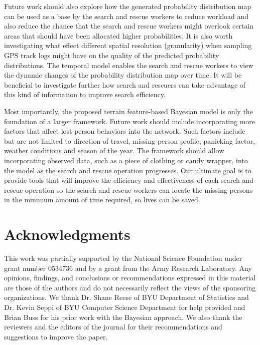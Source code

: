 \documentclass[smallextended,natbib]{svjour3}
\begin{document}
Future work should also explore how the generated probability distribution map can be used as a base by the search and rescue workers to reduce workload and also reduce the chance that the search and rescue workers might overlook certain areas that should have been allocated higher probabilities. It is also worth investigating what effect different spatial resolution (granularity) when sampling GPS track logs might have on the quality of the predicted probability distributions. The temporal model enables the search and rescue workers to view the dynamic changes of the probability distribution map over time. It will be beneficial to investigate further how search and rescuers can take advantage of this kind of information to improve search efficiency.

Most importantly, the proposed terrain feature-based Bayesian model is only the foundation of a larger framework. Future work should include incorporating more factors that affect lost-person behaviors into the network. Such factors include but are not limited to direction of travel, missing person profile, panicking factor, weather conditions and season of the year. The framework should allow incorporating observed data, such as a piece of clothing or candy wrapper, into the model as the search and rescue operation progresses. Our ultimate goal is to provide tools that will improve the efficiency and effectiveness of each search and rescue operation so the search and rescue workers can locate the missing persons in the minimum amount of time required, so lives can be saved.

\section{Acknowledgments}
\label{sec:7}

This work was partially supported by the National Science Foundation under grant number 0534736 and by a grant from the Army Research Laboratory. Any opinions, findings, and conclusions or recommendations expressed in this material are those of the authors and do not necessarily reflect the views of the sponsoring organizations. We thank Dr. Shane Reese of BYU Department of Statistics and Dr. Kevin Seppi of BYU Computer Science Department for help provided and Brian Buss for his prior work with the Bayesian approach. We also thank the reviewers and the editors of the journal for their recommendations and suggestions to improve the paper.

%
%


\end{document}
